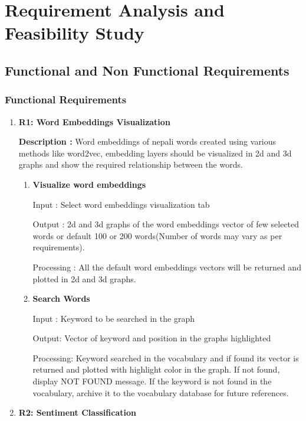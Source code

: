 \chapter{Requirement Analysis and Feasibility Study}
\section{Functional and Non Functional Requirements}
\subsection{Functional Requirements}
\begin{enumerate}[font=\bfseries]
    \item \textbf{R1: Word Embeddings Visualization}

          \textbf{Description :} Word embeddings of nepali words created using various methods like word2vec, embedding layers should be visualized in 2d and 3d graphs and show the required relationship between the words.

          \begin{enumerate}
              \item \textbf{Visualize word embeddings}

                    Input : Select word embeddings visualization tab

                    Output : 2d and 3d graphs of the word embeddings vector of few selected words or default 100 or 200 words(Number of words may vary as per requirements).

                    Processing : All the default word embeddings vectors will be returned and plotted in 2d and 3d graphs.

              \item \textbf{Search Words}

                    Input : Keyword to be searched in the graph

                    Output: Vector of keyword and position in the graphs highlighted

                    Processing: Keyword searched in the vocabulary and if found its vector is returned and plotted with highlight color in the graph. If not found, display NOT FOUND message. If the keyword is not found in the vocabulary, archive it to the vocabulary database for future references.
          \end{enumerate}

    \item \textbf{R2: Sentiment Classification}


\end{enumerate}
